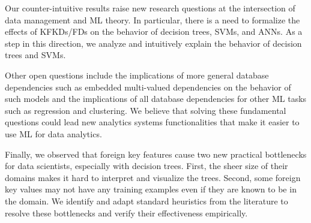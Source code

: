 \documentclass{vldb}
\newcommand{\eat}[1]{}
\begin{document}
Our counter-intuitive results raise new research questions at the intersection of data management and ML theory.
In particular, there is a need to formalize the effects of KFKDs/FDs on the behavior of decision trees, SVMs, and ANNs.
As a step in this direction, we analyze and intuitively explain the behavior of decision trees and SVMs.
\eat{
Essentially, we explain why RBF-SVMs with foreign key features behave somewhat like a 1-nearest neighbor classifier due to 
the high dimensionality of foreign key features with one-hot encoding. 
While this leads to a form of \textit{memorization} of the foreign key's domain, this seems to have little effect on the 
model's generalization or test errors. This is similar to how memorization seems to occur in deep neural networks~\cite{rechtdnn}, 
but a key difference in our setting is that such memorization does not apply to \textit{all} features. 
We also discuss why decision trees are robust to operating with foreign key features. 
}
Other open questions include the implications of more general database dependencies such as embedded multi-valued dependencies on 
the behavior of such models and the implications of all database dependencies for other ML tasks such as regression and clustering.
We believe that solving these fundamental questions could lead new analytics systems functionalities that make it easier to use ML
for data analytics.

\eat{
We extend the worst-case simulation scenario for linear models by replicating the foreign feature that determines the target multiple times. The idea is to make a model that uses 
the foreign key feature alone to overfit more than one that uses the foreign features. In particular, for the RBF-SVM, this scenario demonstrates that it behaves 
more similarly to a 1-nearest neighbor classifier when using the foreign key feature but less so when the number of relevant foreign features are increased.
}

Finally, we observed that foreign key features cause two new practical bottlenecks for data scientists, especially with decision trees. 
First, the sheer size of their domains makes it hard to interpret and visualize the trees. 
Second, some foreign key values may not have any training examples even if they are known to be in the domain. 
We identify and adapt standard heuristics from the literature to resolve these bottlenecks and verify their effectiveness empirically.
\eat{ 
For the first bottleneck, we propose simple lossy 
\textit{domain compression} methods that are configurable with a user-given size budget. For the second bottleneck, we propose a form of foreign key \textit{smoothing} 
that exploits foreign features as side information. We validate the accuracy of these techniques using both real and synthetic datasets.
}
\end{document}
